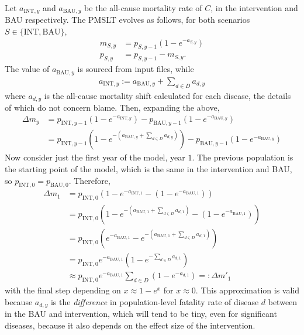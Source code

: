 \documentclass[]{article}
\begin{document}
Let $a_{\text{INT}, y}$ and $a_{\text{BAU}, y}$ be the all-cause mortality rate of $C$, in the intervention and BAU respectively. The PMSLT evolves as follows, for both scenarios $S \in \{\text{INT}, \text{BAU}\}$,
\begin{align*}
	m_{S, y} &= p_{S, y - 1} \left(1 - e^{-a_{S, y}}\right) \\
	p_{S, y} &= p_{S, y - 1} - m_{S, y}.
\end{align*}
The value of $a_{\text{BAU}, y}$ is sourced from input files, while
\begin{align*}
	a_{\text{INT}, y} := a_{\text{BAU}, y} + \sum_{d \in D} a_{d, y}
\end{align*}
where $a_{d, y}$ is the all-cause mortality shift calculated for each disease, the details of which do not concern blame. Then, expanding the above,
\begin{align*}
	\Delta m_y &= p_{\text{INT}, y - 1} \left(1 - e^{-a_{\text{INT}, y}}\right) - p_{\text{BAU}, y - 1} \left(1 - e^{-a_{\text{BAU}, y}}\right) \\
	&= p_{\text{INT}, y - 1} \left(1 - e^{-(a_{\text{BAU}, y} + \sum_{d \in D} a_{d, y})}\right) - p_{\text{BAU}, y - 1} \left(1 - e^{-a_{\text{BAU}, y}}\right)
\end{align*}
Now consider just the first year of the model, year $1$. The previous population is the starting point of the model, which is the same in the intervention and BAU, so $p_{\text{INT}, 0} = p_{\text{BAU}, 0}$. Therefore,
\begin{align*}
	\Delta m_1 &= p_{\text{INT}, 0} \left(1 - e^{-a_{\text{INT}, 1}} - \left(1 - e^{-a_{\text{BAU}, 1}}\right)\right) \\
	&= p_{\text{INT}, 0} \left(1 - e^{-(a_{\text{BAU}, 1} + \sum_{d \in D} a_{d, 1})} - \left(1 - e^{-a_{\text{BAU}, 1}}\right)\right) \\
	&= p_{\text{INT}, 0} \left(e^{-a_{\text{BAU}, 1}} - e^{-(a_{\text{BAU}, 1} + \sum_{d \in D} a_{d, 1})}\right) \\
	&= p_{\text{INT}, 0} e^{-a_{\text{BAU}, 1}} \left(1 - e^{-\sum_{d \in D} a_{d, 1}}\right) \\
	&\approx p_{\text{INT}, 0} e^{-a_{\text{BAU}, 1}} \sum_{d \in D} \left(1 - e^{-a_{d, 1}}\right) =: \Delta m'_1
\end{align*}
with the final step depending on $x \approx 1 - e^x$ for $x \approx 0$. This approximation is valid because $a_{d,y}$ is the \textit{difference} in population-level fatality rate of disease $d$ between in the BAU and intervention, which will tend to be tiny, even for significant diseases, because it also depends on the effect size of the intervention.
\end{document}
